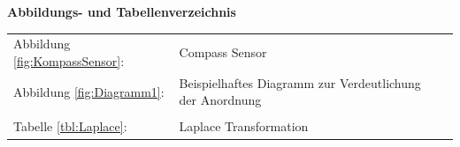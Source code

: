 \noindent
\textbf{\Large{Abbildungs- und Tabellenverzeichnis}} 
\vspace*{0.5 cm}
%
\begin{table}[h]
	\begin{tabularx}{\textwidth}{lXr}
		Abbildung \ref{fig:KompassSensor}: & Compass Sensor \dotfill & \pageref{fig:KompassSensor}\\ %
		Abbildung \ref{fig:Diagramm1}: & Beispielhaftes Diagramm zur Verdeutlichung der Anordnung \dotfill & \pageref{fig:Diagramm1}\\ 
	& & \\
		Tabelle \ref{tbl:Laplace}: & Laplace Transformation \dotfill & \pageref{tbl:Laplace}\\ %
		\end{tabularx}
	\label{tab:Abbildungsverzeichnis} 
\end{table}